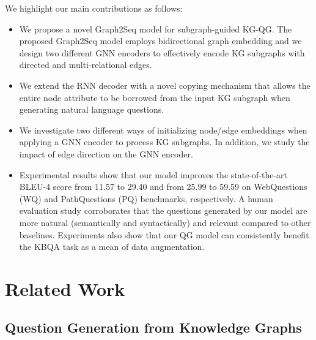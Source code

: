 \documentclass[journal]{IEEEtran}
\begin{document}
We highlight our main contributions as follows:
\begin{itemize}[noitemsep]
\item We propose a novel Graph2Seq model for subgraph-guided KG-QG. 
    The proposed Graph2Seq model employs bidirectional graph embedding and we design two different GNN encoders to effectively encode KG subgraphs with directed and multi-relational edges. 
    \item We extend the RNN decoder with a novel copying mechanism that allows the entire node attribute to be borrowed from the input KG subgraph when generating natural language questions.
    \item We investigate two different ways of initializing node/edge embeddings when applying a GNN encoder to process KG subgraphs. 
    In addition, we study the impact of edge direction on the GNN encoder.
    \item Experimental results show that our model improves the state-of-the-art BLEU-4 score from 11.57 to 29.40 and from 25.99 to 59.59 on WebQuestions (WQ) and PathQuestions (PQ) benchmarks, respectively.
    A human evaluation study corroborates that the questions generated by our model are more natural (semantically and syntactically) and relevant compared to other baselines. 
    Experiments also show that our QG model can consistently benefit the KBQA task as a mean of data augmentation.
\end{itemize}






\section{Related Work}

\subsection{Question Generation from Knowledge Graphs}\label{sec:related_work_nqg}
\end{document}
